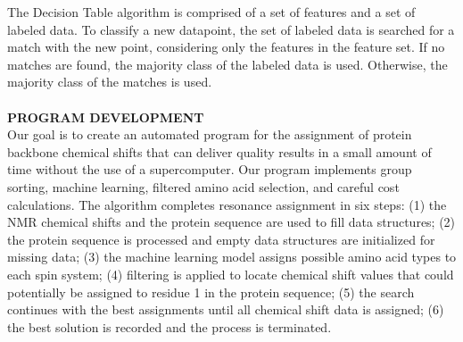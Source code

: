 \documentclass{article}
\begin{document}
\indent The Decision Table algorithm \cite{decisiontable_algorithm} is comprised of a set of features and a set of labeled data. To classify a new datapoint, the set of labeled data is searched for a match with the new point, considering only the features in the feature set. If no matches are found, the majority class of the labeled data is used. Otherwise, the majority class of the matches is used.
\\\\
\noindent\textbf{PROGRAM DEVELOPMENT}\\
\indent Our goal is to create an automated program for the assignment of protein backbone chemical shifts that can deliver quality results in a small amount of time without the use of a supercomputer. Our program implements group sorting, machine learning, filtered amino acid selection, and careful cost calculations. The algorithm completes resonance assignment in six steps: (1) the NMR chemical shifts and the protein sequence are used to fill data structures; (2) the protein sequence is processed and empty data structures are initialized for missing data; (3) the machine learning model assigns possible amino acid types to each spin system; (4) filtering is applied to locate chemical shift values that could potentially be assigned to residue 1 in the protein sequence; (5) the search continues with the best assignments until all chemical shift data is assigned; (6) the best solution is recorded and the process is terminated. 
\end{document}
